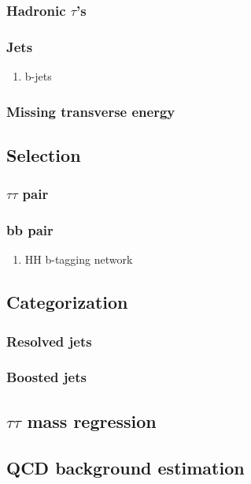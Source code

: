 \documentclass[11pt]{article}
\begin{document}
\subsubsection{Hadronic \(\tau\)'s}
\label{sec:org836d741}
\subsubsection{Jets}
\label{sec:orgb65a371}
\begin{enumerate}
\item b-jets
\label{sec:orgaa6b19d}
\end{enumerate}
\subsubsection{Missing transverse energy}
\label{sec:orgf6f6421}
\subsection{Selection}
\label{sec:org7510412}
\subsubsection{\(\tau \tau\) pair}
\label{sec:org6d767c7}
\subsubsection{bb pair}
\label{sec:orgc3e4a16}
\begin{enumerate}
\item HH b-tagging network
\label{sec:orgba4d3e2}
\end{enumerate}
\subsection{Categorization}
\label{sec:orgb176db6}
\label{sec:categorization}
\subsubsection{Resolved jets}
\label{sec:org8d4b505}
\subsubsection{Boosted jets}
\label{sec:orgdbc8704}
\subsection{\(\tau \tau\) mass regression}
\label{sec:orgccb65d9}
\subsection{QCD background estimation}
\label{sec:orgc6c67e2}
\end{document}
